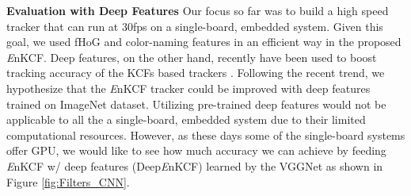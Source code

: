 \documentclass[10pt,twocolumn,letterpaper]{article}
\begin{document}
\textbf{Evaluation with Deep Features} Our focus so far was to build a
high speed tracker that can run at $30$fps on a single-board, embedded
system. Given this goal, we used fHoG and color-naming features in an
efficient way in the proposed {\it E}nKCF. Deep features, on the
other hand, recently have been used to boost tracking accuracy of the
KCFs based trackers \cite{ma2015hierarchical,
  danelljan2015convolutional}. Following the recent trend, we hypothesize 
that the {\it E}nKCF tracker could be improved with deep features trained on ImageNet
dataset. Utilizing pre-trained deep features would not be applicable to
all the a single-board, embedded system due to their limited
computational resources. However, as these days some of the single-board
systems offer GPU, we would like to see how much accuracy we can
achieve by feeding {\it E}nKCF w/ deep features (Deep{\it E}nKCF) learned by the VGGNet
as shown in Figure \ref{fig:Filters_CNN}.
\end{document}
